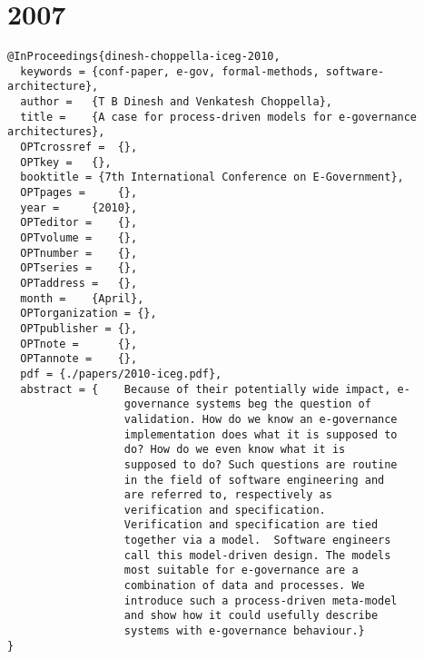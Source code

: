 \documentclass[11pt]{article}
\begin{document}
\section{2007}
\label{sec:orgfee4056}
\lstset{language=bibtex,label= ,caption= ,captionpos=b,numbers=none}
\begin{lstlisting}
@InProceedings{dinesh-choppella-iceg-2010,
  keywords = {conf-paper, e-gov, formal-methods, software-architecture},
  author = 	 {T B Dinesh and Venkatesh Choppella},
  title = 	 {A case for process-driven models for e-governance architectures},
  OPTcrossref =  {},
  OPTkey = 	 {},
  booktitle = {7th International Conference on E-Government},
  OPTpages = 	 {},
  year = 	 {2010},
  OPTeditor = 	 {},
  OPTvolume = 	 {},
  OPTnumber = 	 {},
  OPTseries = 	 {},
  OPTaddress = 	 {},
  month = 	 {April},
  OPTorganization = {},
  OPTpublisher = {},
  OPTnote = 	 {},
  OPTannote = 	 {},
  pdf = {./papers/2010-iceg.pdf},
  abstract = {    Because of their potentially wide impact, e-
                  governance systems beg the question of
                  validation. How do we know an e-governance
                  implementation does what it is supposed to
                  do? How do we even know what it is
                  supposed to do? Such questions are routine
                  in the field of software engineering and
                  are referred to, respectively as
                  verification and specification.
                  Verification and specification are tied
                  together via a model.  Software engineers
                  call this model-driven design. The models
                  most suitable for e-governance are a
                  combination of data and processes. We
                  introduce such a process-driven meta-model
                  and show how it could usefully describe
                  systems with e-governance behaviour.}
}



\end{lstlisting}
\end{document}
